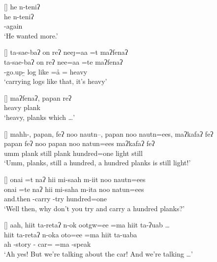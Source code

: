 \begin{exe}
[]{\glll
	he n-teniʔ \\
	he n-teniʔ \\
	{\he} \n-again \\
\glt `He wanted more.'}

[]{\glll
	ta-sae-baʔ  on reʔ nee\j=aa =t maʔfenaʔ \\
	ta-sae-baʔ  on reʔ nee=aa =te maʔfenaʔ \\
	\tg-go.up-{\b} log like {\reqt} {\nee=\aa} ={\te} heavy \\
\glt `carrying logs like that, it's heavy'}

\vspace{-4pt}
[]{\gll
	maʔfenaʔ, papan reʔ \\
	heavy plank {\req}\\
\glt `heavy, planks which {\ldots}'}

[]{\glll
	mahh-, papan, feʔ noo nautn--, papan noo nautn=ees, maʔkafaʔ feʔ \\
	{} papan feʔ noo {} papan noo natun=ees maʔkafaʔ feʔ \\
	umm plank still {\manaq} {} plank {\manaq} hundred=one light still \\
\glt `Umm, planks, still a hundred, a hundred planks is still light!'}

[]{\glll
	{onai =t} naʔ hii mi-saah m-iit noo nautn=ees \\
	{onai =te} naʔ hii mi-saha m-ita noo natun=ees \\
	and.then {} {\hii} \mi-carry \m-try {\manaq} hundred=one \\
\glt `Well then, why don't you try and carry a hundred planks?'}


[]{\glll
	aah, hiit ta-retaʔ n-ok ootgw=ee =ma hiit ta-ʔuab {\ldots}\\
	{} hiit ta-retaʔ n-oka oto=ee =ma hiit ta-uaba \\
	ah {\hiit} {\ta}-story {\n-\ok} car={\ee} =ma {\hiit} {\ta}-speak \\
\glt `Ah yes! But we're talking about the car! And we're talking {\ldots}'}


\end{exe}
